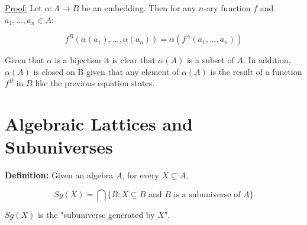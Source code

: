 \documentclass[a4paper, 11pt]{article}
\begin{document}
\noindent
\underline{Proof:} Let $\alpha: A \rightarrow B$ be an embedding. Then for any $n$-ary function $f$ and $a_1, ..., a_n \in A$:

$$f^B(\alpha (a_1), ..., \alpha (a_n)) = \alpha (f^A(a_1, ..., a_n))$$

Given that $\alpha$ is a bijection it is clear that $\alpha(A)$ is a subset of $A$. In addition, $\alpha(A)$ is closed on B given that any element of $\alpha(A)$ is the result of a function $f^B$ in $B$ like the previous equation states.

\section{Algebraic Lattices and Subuniverses}

\begin{tcolorbox} 
	\textbf{Definition:} Given an algebra $A$, for every $X \subseteq A$,

	$$Sg(X) = \bigcap\{B : X \subseteq B \text{ and } B \text{ is a subuniverse of } A\}$$

	$Sg(X)$ is the "subuniverse generated by $X$".
\end{tcolorbox}
\end{document}
